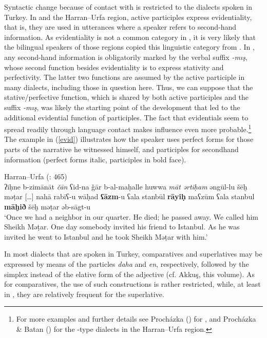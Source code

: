 \documentclass[output=paper]{langsci/langscibook}
\begin{document}
Syntactic change because of contact with  is restricted to the  dialects spoken in Turkey. In  and the Harran--Urfa region, active participles express evidentiality, that is, they are used in utterances where a speaker refers to second-hand information. As evidentiality is not a common category in , it is very likely that the bilingual  speakers of those regions copied this linguistic category from . In , any second-hand information is obligatorily marked by the verbal suffix \textit{-mış}, whose second function besides evidentiality is to express stativity and perfectivity. The latter two functions are assumed by the active {participle} in many  dialects, including those in question here. Thus, we can suppose that the {stative}/perfective function, which is shared by both  active participles and the  suffix \textit{-mış}, was likely the starting point of the development that led to the additional evidential function of  participles. The fact that evidentials seem to spread readily through language contact \citep[10]{Aikhenvald2004} makes  influence even more probable.\footnote{For more examples and further details see Procházka (\citeyear[200--201]{Procházka2002Cukurova}) for , and Procházka \& Batan (\citeyear[464--465]{ProcházkaBatan2016}) for the -type dialects in the Harran--Urfa region.} The example in (\ref{evid}) illustrates how the speaker uses perfect forms for those parts of the narrative he witnessed himself, and participles for secondhand information (perfect forms italic, participles in bold face). 

\ea \label{evid}
{Harran--Urfa (\citealt{ProcházkaBatan2016}: 465)}\\
  ʔiḥne b-zimānāt \textit{čān} ʕid-na ǧār b-al-maḥalle huwwa \textit{māt} \textit{ərtiḥam} əngūl-lu šēḫ mǝṭar […] nahā{\R} rabīʕ-u wāḥad  \textbf{ʕāzm}{}-u ʕala stanbūl \textbf{rāyiḥ} maʕzūm ʕala stanbul \textbf{māḫið} šēḫ mǝṭar əb-sāgt-u\\

\glt ‘Once we had a neighbor in our quarter. He died; he passed away. We called him Sheikh Mǝṭar. One day somebody invited his friend to Istanbul. As he was invited he went to Istanbul and he took Sheikh Mǝṭar with him.’
\z

In most  dialects that are spoken in Turkey, comparatives and superlatives may be expressed by means of the  particles \textit{daha} and \textit{en}, respectively, followed by the simplex instead of the {elative} form of the adjective (cf. Akkuş, this volume). As for comparatives, the use of such constructions is rather restricted, while, at least in  , they are relatively frequent for the {superlative}. 
\end{document}
